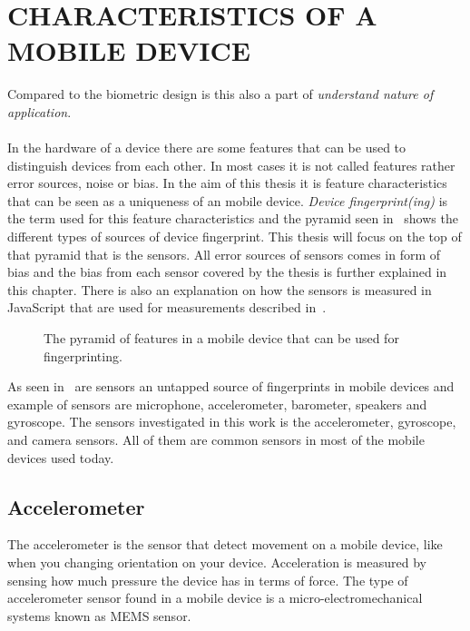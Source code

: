\chapter{CHARACTERISTICS OF A MOBILE DEVICE} \label{cha:character}
Compared to the biometric design is this also a part of \textit{understand nature of application}.\\
\\
In the hardware of a device there are some features that can be used to distinguish devices from each other. In most cases it is not called features rather error sources, noise or bias. In the aim of this thesis it is feature characteristics that can be seen as a uniqueness of an mobile device. \textit{Device fingerprint(ing)} is the term used for this feature characteristics and the pyramid seen in~ shows the different types of sources of device fingerprint. This thesis will focus on the top of that pyramid that is the sensors. All error sources of sensors comes in form of bias and the bias from each sensor covered by the thesis is further explained in this chapter. There is also an explanation on how the sensors is measured in JavaScript that are used for measurements described in~. \\


\begin{figure}[!htb]
	
	\caption{\label{fig:pyramid} The pyramid of features in a mobile device that can be used for fingerprinting.\cite[]{sensor:acoustic}}
\end{figure}

As seen in~ are sensors an untapped source of fingerprints in mobile devices and example of sensors are microphone, accelerometer, barometer, speakers and gyroscope. The sensors investigated in this work is the accelerometer, gyroscope, and camera sensors. All of them are common sensors in most of the mobile devices used today.


\section{Accelerometer}\label{sec:accelerometer}
The accelerometer is the sensor that detect movement on a mobile device, like when you changing orientation on your device. Acceleration is measured by sensing how much pressure the device has in terms of force. The type of accelerometer sensor found in a mobile device is a micro-electromechanical systems known as MEMS sensor. \cite[]{sensors:fusion}
